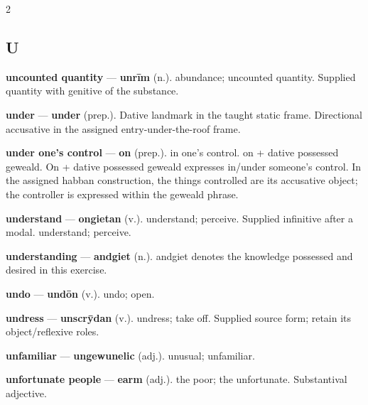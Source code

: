 \begin{multicols}{2}
\subsection*{U}
\textbf{uncounted quantity} — \textbf{unrīm} (n.). abundance; uncounted quantity. Supplied quantity with genitive of the substance.\par
\textbf{under} — \textbf{under} (prep.). Dative landmark in the taught static frame. Directional accusative in the assigned entry-under-the-roof frame.\par
\textbf{under one's control} — \textbf{on} (prep.). in one's control. on + dative possessed geweald. On + dative possessed geweald expresses in/under someone’s control. In the assigned habban construction, the things controlled are its accusative object; the controller is expressed within the geweald phrase.\par
\textbf{understand} — \textbf{ongietan} (v.). understand; perceive. Supplied infinitive after a modal. understand; perceive.\par
\textbf{understanding} — \textbf{andgiet} (n.). andgiet denotes the knowledge possessed and desired in this exercise.\par
\textbf{undo} — \textbf{undōn} (v.). undo; open.\par
\textbf{undress} — \textbf{unscrȳdan} (v.). undress; take off. Supplied source form; retain its object/reflexive roles.\par
\textbf{unfamiliar} — \textbf{ungewunelic} (adj.). unusual; unfamiliar.\par
\textbf{unfortunate people} — \textbf{earm} (adj.). the poor; the unfortunate. Substantival adjective.\par

\end{multicols}
